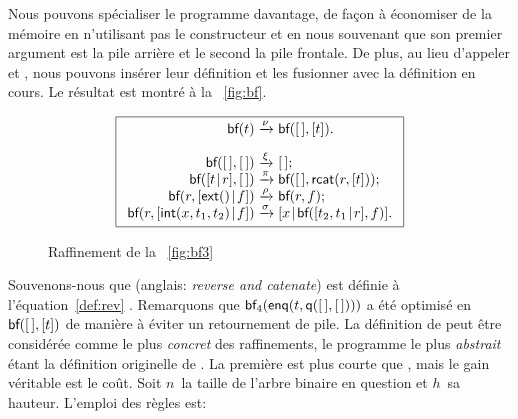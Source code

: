 Nous pouvons spécialiser le programme davantage, de façon à économiser
de la mémoire en n'utilisant pas le constructeur
 et en nous souvenant que son premier
argument est la pile arrière et le second la pile frontale. De plus,
au lieu d'appeler  et
, nous pouvons insérer leur
définition et les fusionner avec la définition en cours. Le résultat
est montré à la \fig~\vref{fig:bf}.
\begin{figure}
\begin{equation*}
\boxed{
\begin{array}{r@{\;}c@{\;}l}
\fun{bf}(t) & \xrightarrow{\smash{\nu}} & \fun{bf}(\el,[t]).\\
\\
\fun{bf}(\el,\el) & \xrightarrow{\smash{\xi}} & \el;\\
\fun{bf}(\cons{t}{r},\el) & \xrightarrow{\smash{\pi}} &
  \fun{bf}(\el,\fun{rcat}(r,[t]));\\
\fun{bf}(r,\cons{\fun{ext}()}{f})
  & \xrightarrow{\smash{\rho}} & \fun{bf}(r,f);\\
\fun{bf}(r,\cons{\fun{int}(x,t_1,t_2)}{f})
  & \xrightarrow{\smash{\sigma}}
  & \cons{x}{\fun{bf}(\cons{t_2,t_1}{r},f)}.
\end{array}}
\end{equation*}
\caption{Raffinement de la \fig~\vref{fig:bf3}}
\label{fig:bf}
\end{figure}
Souvenons-nous que  (anglais:
\emph{reverse and catenate}) est définie à l'équation~\eqref{def:rev}
. Remarquons que
\(\textsf{bf}_4(\textsf{enq}(t,\textsf{q}([\,],[\,])))\)
a été optimisé en \(\textsf{bf}([\,],[t])\) de
manière à éviter un retournement de pile. La définition de
 peut être considérée comme le plus
\emph{concret} des raffinements, le programme le plus \emph{abstrait}
étant la définition originelle de
. La première est plus
courte que , mais le gain
véritable est le coût. Soit \(n\)~la taille de l'arbre binaire en
question et \(h\)~sa hauteur. L'emploi
des règles est:
